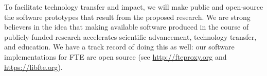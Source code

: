 
To facilitate technology transfer and impact, 
we will make public and open-source the software prototypes that result from the
proposed research. We are strong believers in the idea that making available software 
produced in the course of publicly-funded research accelerates scientific
advancement, technology transfer, and education.
We have a track record of doing this as well: 
our software implementations for FTE are open
source (see \url{http://fteproxy.org} and \url{https://libfte.org}). 










